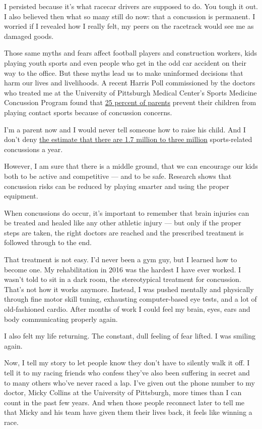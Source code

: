 I persisted because it's what racecar drivers are supposed to do. You
tough it out. I also believed then what so many still do now: that a
concussion is permanent. I worried if I revealed how I really felt, my
peers on the racetrack would see me as damaged goods.

Those same myths and fears affect football players and construction
workers, kids playing youth sports and even people who get in the odd
car accident on their way to the office. But these myths lead us to make
uninformed decisions that harm our lives and livelihoods. A recent
Harris Poll commissioned by the doctors who treated me at the University
of Pittsburgh Medical Center's Sports Medicine Concussion Program found
that
\href{http://rethinkconcussions.upmc.com/wp-content/uploads/2015/09/harris-poll-report.pdf}{25
percent of parents} prevent their children from playing contact sports
because of concussion concerns.

I'm a parent now and I would never tell someone how to raise his child.
And I don't deny
\href{https://www.upmc.com/services/sports-medicine/services/concussion/facts-statistics}{the
estimate that there are 1.7 million to three million} sports-related
concussions a year.

However, I am sure that there is a middle ground, that we can encourage
our kids both to be active and competitive --- and to be safe. Research
shows that concussion risks can be reduced by playing smarter and using
the proper equipment.

When concussions do occur, it's important to remember that brain
injuries can be treated and healed like any other athletic injury ---
but only if the proper steps are taken, the right doctors are reached
and the prescribed treatment is followed through to the end.

That treatment is not easy. I'd never been a gym guy, but I learned how
to become one. My rehabilitation in 2016 was the hardest I have ever
worked. I wasn't told to sit in a dark room, the stereotypical treatment
for concussion. That's not how it works anymore. Instead, I was pushed
mentally and physically through fine motor skill tuning, exhausting
computer-based eye tests, and a lot of old-fashioned cardio. After
months of work I could feel my brain, eyes, ears and body communicating
properly again.

I also felt my life returning. The constant, dull feeling of fear
lifted. I was smiling again.

Now, I tell my story to let people know they don't have to silently walk
it off. I tell it to my racing friends who confess they've also been
suffering in secret and to many others who've never raced a lap. I've
given out the phone number to my doctor, Micky Collins at the University
of Pittsburgh, more times than I can count in the past few years. And
when those people reconnect later to tell me that Micky and his team
have given them their lives back, it feels like winning a race.

